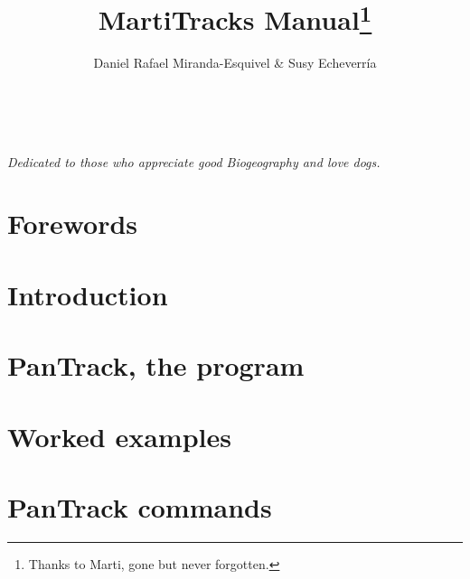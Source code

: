 \documentclass[nols]{tufte-book}%
\title{{M}arti{T}racks Manual\thanks{Thanks to Marti, gone but never forgotten.}}
\author[Daniel Rafael Miranda-Esquivel \& Susy Echeverr\'ia]{Daniel Rafael Miranda-Esquivel \& Susy Echeverr\'ia}
\begin{document}
% 
% 


% 
% 
\frontmatter




\maketitle




\vfill
{}

\tableofcontents

\listoffigures

\listoftables

\cleardoublepage
~\vfill
\begin{doublespace}
\noindent\fontsize{18}{22}\selectfont\itshape
\nohyphenation
Dedicated to those who appreciate good Biogeography and love dogs.
\end{doublespace}

\chapter{Forewords}



\mainmatter


\chapter{Introduction}
\label{ch:panbio}





\chapter{PanTrack, the program}





\chapter{Worked examples}





 

\chapter{PanTrack commands}







\backmatter




\printindex
\end{document}
